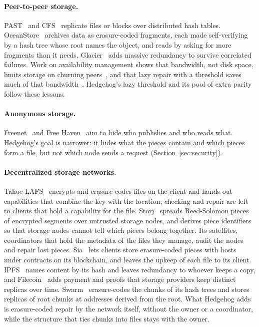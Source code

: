 \documentclass[10pt,a4paper,final]{article}
\begin{document}
\paragraph{Peer-to-peer storage.} PAST~\cite{rowstron2001} and CFS~\cite{dabek2001} replicate files or blocks over
distributed hash tables. OceanStore~\cite{kubiatowicz2000} archives data as erasure-coded fragments, each made
self-verifying by a hash tree whose root names the object, and reads by asking for more fragments than it needs.
Glacier~\cite{haeberlen2005} adds massive redundancy to survive correlated failures. Work on availability
management shows that bandwidth, not disk space, limits storage on churning peers~\cite{blake2003}, and that lazy
repair with a threshold saves much of that bandwidth~\cite{bhagwan2004,chun2006,giroire2010}. Hedgehog's lazy
threshold and its pool of extra parity follow these lessons.

\paragraph{Anonymous storage.} Freenet~\cite{clarke2001} and Free Haven~\cite{dingledine2000} aim to hide who
publishes and who reads what. Hedgehog's goal is narrower: it hides what the pieces contain and which pieces form a
file, but not which node sends a request (Section~\ref{sec:security}).

\paragraph{Decentralized storage networks.} Tahoe-LAFS~\cite{wilcox2008} encrypts and erasure-codes files on the
client and hands out capabilities that combine the key with the location; checking and repair are left to clients
that hold a capability for the file. Storj~\cite{storj2018} spreads Reed-Solomon pieces of encrypted segments over
untrusted storage nodes, and derives piece identifiers so that storage nodes cannot tell which pieces belong
together. Its satellites, coordinators that hold the metadata of the files they manage, audit the nodes and repair
lost pieces.
Sia~\cite{sia2014} lets clients store erasure-coded pieces with hosts under contracts on its blockchain, and leaves
the upkeep of each file to its client. IPFS~\cite{benet2014} names content by its hash and leaves redundancy to
whoever keeps a copy, and Filecoin~\cite{filecoin2017} adds payment and proofs that storage providers keep distinct
replicas over time. Swarm~\cite{swarm2024} erasure-codes the chunks of its hash trees and stores replicas of root
chunks at addresses derived from the root. What Hedgehog adds is erasure-coded repair by the network itself,
without the owner or a coordinator, while the structure that ties chunks into files stays with the owner.
\end{document}

